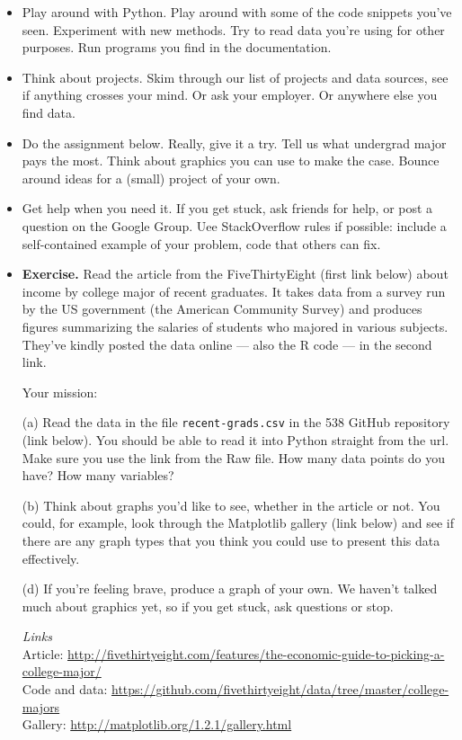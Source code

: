 \documentclass[11pt]{article}
\begin{document}
\begin{itemize}
\item Play around with Python.
Play around with some of the code snippets you've seen.
Experiment with new methods.
Try to read data you're using for other purposes.
Run programs you find in the documentation.

\item Think about projects.
Skim through our list of projects and data sources, see if anything crosses your mind.
Or ask your employer.  Or anywhere else you find data.

\item Do the assignment below.  Really, give it a try.  Tell us what undergrad major pays the most.
Think about graphics you can use to make the case.
Bounce around ideas for a (small) project of your own.

\item Get help when you need it.
If you get stuck, ask friends for help, or post a question on the Google Group.
Uee StackOverflow rules if possible:  include a self-contained example of your problem, code that others can fix.

\item {\bf Exercise.}
Read the article from the FiveThirtyEight (first link below) about income
by college major of recent graduates.
It takes data from a survey run by the US government (the American Community Survey) and
produces figures summarizing the salaries of students who majored in
various subjects.  They've kindly posted the data online --- also the R
code --- in the second link.

Your mission:

(a) Read the data in the file {\tt recent-grads.csv} in the 538 GitHub
repository (link below).
You should be able to read it into Python straight from the url.
Make sure you use the link from the Raw file.
How many data points do you have?  How many
variables?

(b) Think about graphs you'd like to see, whether in the article or
not.  You could, for example, look through the Matplotlib gallery
(link below) and see if there are any graph types that you think you
could use to present this data effectively.

(d) If you're feeling brave, produce a graph of your own.  We haven't
talked much about graphics yet, so if you get stuck, ask questions or stop.

{\it Links\/} \\
Article:  \url{http://fivethirtyeight.com/features/the-economic-guide-to-picking-a-college-major/} \\
Code and data:
\url{https://github.com/fivethirtyeight/data/tree/master/college-majors} \\
Gallery:  \url{http://matplotlib.org/1.2.1/gallery.html}


\end{itemize}
\end{document}
